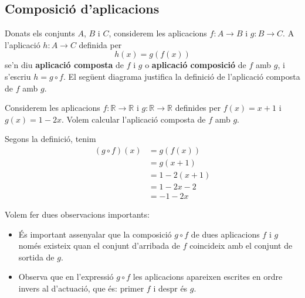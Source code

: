 \subsection{Composici\'{o} d'aplicacions}

Donats els conjunts $A$, $B$ i $C$, considerem les aplicacions $%
f:A\longrightarrow B$ i $g:B\longrightarrow C$. A l'aplicaci\'{o} $%
h:A\longrightarrow C$ definida per%
\begin{equation*}
h(x)=g\left( f(x)\right)
\end{equation*}
se'n diu \textbf{aplicaci\'{o} composta} de $f$ i $g$ o \textbf{aplicaci\'{o}
composici\'{o}} de $f$ amb $g$, i s'escriu $h=g\circ f$. El seg\"{u}ent
diagrama justifica la definici\'{o} de l'aplicaci\'{o} composta de $f$ amb $g
$.

\begin{exem}
Considerem les aplicacions $f:\mathbb{R}\longrightarrow\mathbb{R}$ i $g:%
\mathbb{R}\longrightarrow\mathbb{R}$ definides per $f(x)=x+1$ i $g(x)=1-2x$.
Volem calcular l'aplicaci\'{o} composta de $f$ amb $g$.
\end{exem}

\begin{solucio}
Segons la definici\'{o}, tenim%
\begin{align*}
(g\circ f)(x) & =g\left( f(x)\right) \\
& =g(x+1) \\
& =1-2(x+1) \\
& =1-2x-2 \\
& =-1-2x
\end{align*}
\end{solucio}

\begin{obs}
Volem fer dues observacions importants:

\begin{itemize}
\item \'{E}s important assenyalar que la composici\'{o} $g\circ f$ de dues
aplicacions $f$ i $g$ nom\'{e}s existeix quan el conjunt d'arribada de $f$
coincideix amb el conjunt de sortida de $g$.

\item Observa que en l'expressi\'{o} $g\circ f$ les aplicacions apareixen
escrites en ordre invers al d'actuaci\'{o}, que \'{e}s: primer $f$ i despr%
\'{e}s $g$.
\end{itemize}
\end{obs}

